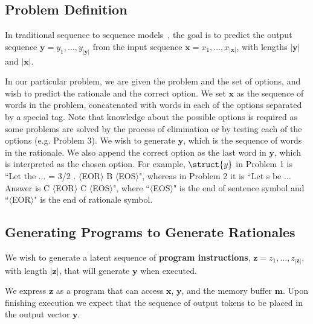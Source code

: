 \subsection{Problem Definition}

In traditional sequence to sequence models~\cite{DBLP:journals/corr/SutskeverVL14,DBLP:journals/corr/BahdanauCB14}, the goal is to predict the output sequence $\boldsymbol{y}=y_1,\ldots,y_{|\boldsymbol{y}|}$ from the input sequence $\boldsymbol{x}=x_1,\ldots,x_{|\boldsymbol{x}|}$, with lengths $|\boldsymbol{y}|$ and $|\boldsymbol{x}|$.

In our particular problem, we are given the problem and the set of options, and wish to predict the rationale and the correct option. We set $\boldsymbol{x}$ as the sequence of words in the problem, concatenated with words in each of the options separated by a special tag. Note that knowledge about the possible options is required as some problems are solved by the process of elimination or by testing each of the options (e.g. Problem 3). We wish to generate $\boldsymbol{y}$, which is the sequence of words in the rationale. We also append the correct option as the last word in $\boldsymbol{y}$, which is interpreted as the chosen option. For example, $\struct{y}$ in Problem 1 is ``Let the $\ldots$ = 3/2 . $\langle$EOR$\rangle$ B $\langle$EOS$\rangle$", whereas in Problem 2 it is ``Let s be $\dots$ Answer is C $\langle$EOR$\rangle$ C $\langle$EOS$\rangle$", where ``$\langle$EOS$\rangle$" is the end of sentence symbol and ``$\langle$EOR$\rangle$" is the end of rationale symbol.

\subsection{Generating Programs to Generate Rationales}

We wish to generate a latent sequence of \textbf{program instructions}, $\boldsymbol{z}=z_1,\ldots,z_{|\boldsymbol{z}|}$, with length ${|\boldsymbol{z}|}$, that will generate $\boldsymbol{y}$ when executed. %

We express $\boldsymbol{z}$ as a program that can access $\boldsymbol{x}$, $\boldsymbol{y}$, and the memory buffer $\boldsymbol{m}$. Upon finishing execution we expect that the sequence of output tokens to be placed in the output vector $\boldsymbol{y}$.

